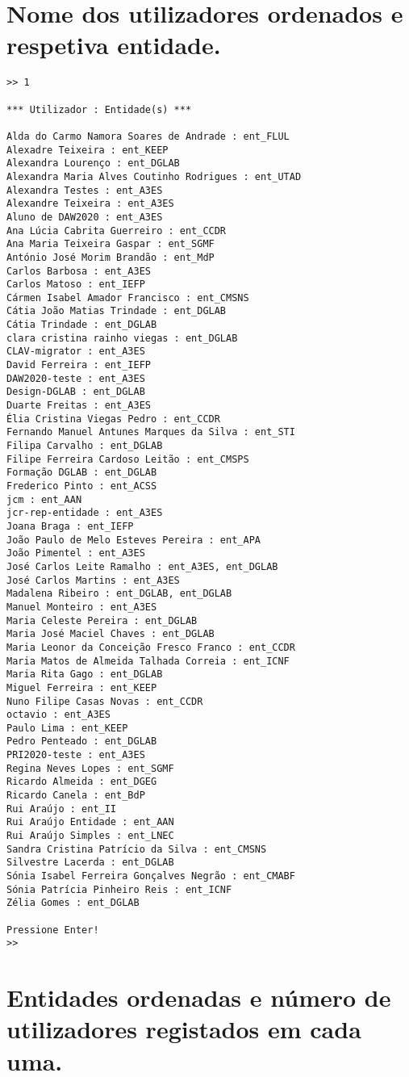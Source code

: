 \documentclass[11pt,a4paper]{report}%
\begin{document}
\section{Nome dos utilizadores ordenados e respetiva entidade.}

\begin{verbatim}
>> 1

*** Utilizador : Entidade(s) ***

Alda do Carmo Namora Soares de Andrade : ent_FLUL
Alexadre Teixeira : ent_KEEP
Alexandra Lourenço : ent_DGLAB
Alexandra Maria Alves Coutinho Rodrigues : ent_UTAD
Alexandra Testes : ent_A3ES
Alexandre Teixeira : ent_A3ES
Aluno de DAW2020 : ent_A3ES
Ana Lúcia Cabrita Guerreiro : ent_CCDR
Ana Maria Teixeira Gaspar : ent_SGMF
António José Morim Brandão : ent_MdP
Carlos Barbosa : ent_A3ES
Carlos Matoso : ent_IEFP
Cármen Isabel Amador Francisco : ent_CMSNS
Cátia João Matias Trindade : ent_DGLAB
Cátia Trindade : ent_DGLAB
clara cristina rainho viegas : ent_DGLAB
CLAV-migrator : ent_A3ES
David Ferreira : ent_IEFP
DAW2020-teste : ent_A3ES
Design-DGLAB : ent_DGLAB
Duarte Freitas : ent_A3ES
Élia Cristina Viegas Pedro : ent_CCDR
Fernando Manuel Antunes Marques da Silva : ent_STI
Filipa Carvalho : ent_DGLAB
Filipe Ferreira Cardoso Leitão : ent_CMSPS
Formação DGLAB : ent_DGLAB
Frederico Pinto : ent_ACSS
jcm : ent_AAN
jcr-rep-entidade : ent_A3ES
Joana Braga : ent_IEFP
João Paulo de Melo Esteves Pereira : ent_APA
João Pimentel : ent_A3ES
José Carlos Leite Ramalho : ent_A3ES, ent_DGLAB
José Carlos Martins : ent_A3ES
Madalena Ribeiro : ent_DGLAB, ent_DGLAB
Manuel Monteiro : ent_A3ES
Maria Celeste Pereira : ent_DGLAB
Maria José Maciel Chaves : ent_DGLAB
Maria Leonor da Conceição Fresco Franco : ent_CCDR
Maria Matos de Almeida Talhada Correia : ent_ICNF
Maria Rita Gago : ent_DGLAB
Miguel Ferreira : ent_KEEP
Nuno Filipe Casas Novas : ent_CCDR
octavio : ent_A3ES
Paulo Lima : ent_KEEP
Pedro Penteado : ent_DGLAB
PRI2020-teste : ent_A3ES
Regina Neves Lopes : ent_SGMF
Ricardo Almeida : ent_DGEG
Ricardo Canela : ent_BdP
Rui Araújo : ent_II
Rui Araújo Entidade : ent_AAN
Rui Araújo Simples : ent_LNEC
Sandra Cristina Patrício da Silva : ent_CMSNS
Silvestre Lacerda : ent_DGLAB
Sónia Isabel Ferreira Gonçalves Negrão : ent_CMABF
Sónia Patrícia Pinheiro Reis : ent_ICNF
Zélia Gomes : ent_DGLAB

Pressione Enter!
>> 
\end{verbatim}


\section{Entidades ordenadas e número de utilizadores registados em cada uma.}
\end{document}
